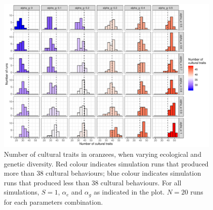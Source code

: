 \documentclass[9pt,twocolumn,twoside,]{pnas-new}
\begin{document}
\begin{figure}[h!]
\begin{center}
\includegraphics[width=17.8cm]{figures/figure_1.pdf}
\caption{Number of cultural traits in oranzees, when varying ecological and genetic diversity. Red colour indicates simulation runs that produced more than 38 cultural behaviours; blue colour indicates simulation runs that produced less than 38 cultural behaviours. For all simulations, $S=1$, $\alpha_e$ and $\alpha_g$ as indicated in the plot. $N=20$ runs for each parameters combination.}
\label{Figure1}
\end{center}
\end{figure}
\end{document}
